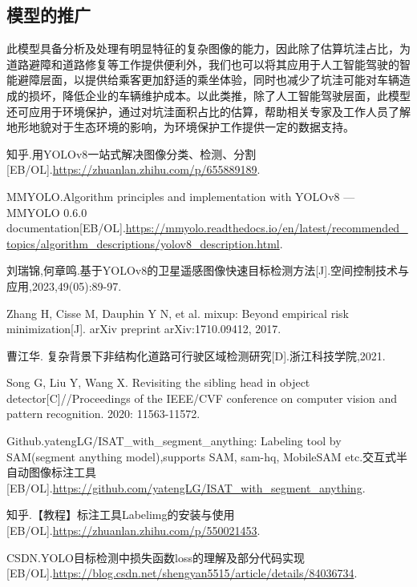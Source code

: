 \documentclass{MathorCupmodeling}
\begin{document}
	\subsection{模型的推广}
	此模型具备分析及处理有明显特征的复杂图像的能力，因此除了估算坑洼占比，为道路避障和道路修复等工作提供便利外，我们也可以将其应用于人工智能驾驶的智能避障层面，以提供给乘客更加舒适的乘坐体验，同时也减少了坑洼可能对车辆造成的损坏，降低企业的车辆维护成本。以此类推，除了人工智能驾驶层面，此模型还可应用于环境保护，通过对坑洼面积占比的估算，帮助相关专家及工作人员了解地形地貌对于生态环境的影响，为环境保护工作提供一定的数据支持。

	\newpage
	
	\begin{spacing}{1.08}
	\begin{thebibliography}{99}
	知乎.用YOLOv8一站式解决图像分类、检测、分割[EB/OL].\url{https://zhuanlan.zhihu.com/p/655889189}.

	MMYOLO.Algorithm principles and implementation with YOLOv8 — MMYOLO 0.6.0 documentation[EB/OL].\url{https://mmyolo.readthedocs.io/en/latest/recommended_topics/algorithm_descriptions/yolov8_description.html}.

	刘瑞锦,何章鸣.基于YOLOv8的卫星遥感图像快速目标检测方法[J].空间控制技术与应用,2023,49(05):89-97.

	Zhang H, Cisse M, Dauphin Y N, et al. mixup: Beyond empirical risk minimization[J]. arXiv preprint arXiv:1710.09412, 2017.

	曹江华. 复杂背景下非结构化道路可行驶区域检测研究[D].浙江科技学院,2021.

	Song G, Liu Y, Wang X. Revisiting the sibling head in object detector[C]//Proceedings of the IEEE/CVF conference on computer vision and pattern recognition. 2020: 11563-11572.

	Github.yatengLG/ISAT\_with\_segment\_anything: Labeling tool by SAM(segment anything model),supports SAM, sam-hq, MobileSAM etc.交互式半自动图像标注工具[EB/OL].\url{https://github.com/yatengLG/ISAT_with_segment_anything}.

	知乎.【教程】标注工具Labelimg的安装与使用[EB/OL].\url{https://zhuanlan.zhihu.com/p/550021453}.

	CSDN.YOLO目标检测中损失函数loss的理解及部分代码实现[EB/OL].\url{https://blog.csdn.net/shengyan5515/article/details/84036734}.


\end{thebibliography}
\end{spacing}
\end{document}
